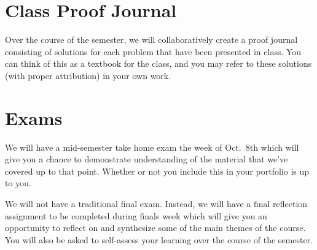 \documentclass[
  letterpaper,
  DIV=11,
  numbers=noendperiod]{scrreprt}
\begin{document}
\chapter{Class Proof Journal}\label{class-proof-journal}

Over the course of the semester, we will collaboratively create a proof
journal consisting of solutions for each problem that have been
presented in class. You can think of this as a textbook for the class,
and you may refer to these solutions (with proper attribution) in your
own work.

\chapter{Exams}\label{exams}

We will have a mid-semester take home exam the week of Oct.~8th which
will give you a chance to demonstrate understanding of the material that
we've covered up to that point. Whether or not you include this in your
portfolio is up to you.

We will not have a traditional final exam. Instead, we will have a final
reflection assignment to be completed during finals week which will give
you an opportunity to reflect on and synthesize some of the main themes
of the course. You will also be asked to self-assess your learning over
the course of the semester.
\end{document}
